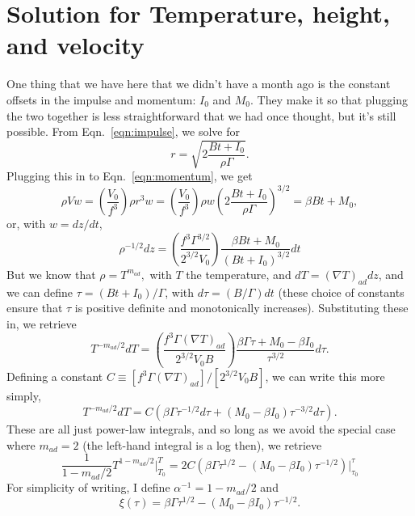 \documentclass[onecolumn, amsmath, amsfonts, amssymb]{aastex62}
\newcommand{\grad}{\ensuremath{\nabla}}
\begin{document}
\section{Solution for Temperature, height, and velocity}
One thing that we have here that we didn't have a month ago is the constant offsets in
the impulse and momentum: $I_0$ and $M_0$.  They make it so that plugging the two together
is less straightforward that we had once thought, but it's still possible. From 
Eqn.~\ref{eqn:impulse}, we solve for
\begin{equation}
r = \sqrt{2\frac{B t + I_0}{\rho\Gamma}}.
\end{equation}
Plugging this in to Eqn.~\ref{eqn:momentum}, we get
\begin{equation}
\rho V w = \left(\frac{V_0}{f^3}\right)\rho r^3 w
= \left(\frac{V_0}{f^3}\right)\rho w \left(2\frac{B t + I_0}{\rho\Gamma}\right)^{3/2} = \beta Bt + M_0,
\end{equation}
or, with $w = dz/dt$,
\begin{equation}
\rho^{-1/2}dz = \left(\frac{f^3 \Gamma^{3/2}}{2^{3/2}V_0}\right)\frac{\beta Bt + M_0}{(Bt + I_0)^{3/2}}dt
\end{equation}
But we know that $\rho = T^{m_{ad}},$ with $T$ the temperature, and $dT = (\grad T)_{ad} dz$,
and we can define $\tau = (Bt + I_0)/\Gamma$, with $d\tau = (B/\Gamma) dt$ (these choice of constants
ensure that $\tau$ is positive definite and monotonically increases). Substituting these in, we retrieve
\begin{equation}
T^{-m_{ad}/2}dT 
= \left(\frac{f^3 \Gamma(\grad T)_{ad}}{2^{3/2}V_0 B}\right)\frac{\beta\Gamma \tau + M_0 - \beta I_0}{\tau^{3/2}}d\tau.
\end{equation}
Defining a constant $C \equiv [f^3 \Gamma(\grad T)_{ad}]/[2^{3/2} V_0 B]$, we can write this more simply,
\begin{equation}
T^{-m_{ad}/2}dT = C\left(\beta \Gamma\tau^{-1/2}d\tau + (M_0 - \beta I_0)\tau^{-3/2}d\tau\right).
\label{eqn:integrand}
\end{equation}
These are all just power-law integrals, and so long as
we avoid the special case where $m_{ad} = 2$ (the left-hand integral is a log then), we retrieve
\begin{equation}
\frac{1}{1 - m_{ad}/2} T^{1 - m_{ad}/2}\bigg|_{T_0}^{T} 
= 2C\left(\beta\Gamma \tau^{1/2} - (M_0 - \beta I_0)\tau^{-1/2}\right)\bigg|_{\tau_0}^{\tau}
\end{equation}
For simplicity of writing, I define $\alpha^{-1} =  1 - m_{ad}/2$ and 
$$
\xi(\tau) = \beta\Gamma \tau^{1/2} - (M_0 - \beta I_0)\tau^{-1/2}.
$$
\end{document}
